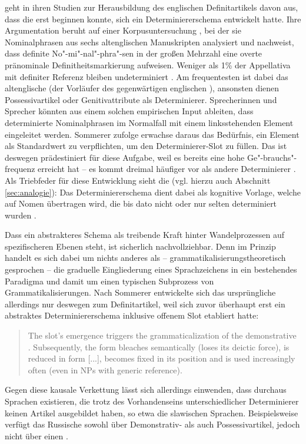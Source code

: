 \textcite{Sommerer2012,Sommerer2015} geht in ihren Studien zur Herausbildung des englischen Definitartikels davon aus, dass die  erst beginnen konnte,  sich ein Determiniererschema entwickelt hatte. Ihre Argumentation beruht auf einer  Korpusuntersuchung \parencite[vgl.][197--198]{Sommerer2012}, bei der sie Nominalphrasen aus sechs altenglischen Manuskripten analysiert und nachweist, dass definite No"-mi"-nal"-phra"-sen in der großen Mehrzahl eine overte pränominale Definitheitsmarkierung  aufweisen. Weniger als 1\% der Appellativa mit definiter Referenz bleiben undeterminiert \parencite[122]{Sommerer2015}. Am frequentesten ist dabei das altenglische   (der Vorläufer des gegenwärtigen englischen ), ansonsten dienen Possessivartikel  oder Genitivattribute als Determinierer. Sprecherinnen und Sprecher könnten aus einem solchen empirischen Input ableiten, dass determinierte Nominalphrasen im Normalfall mit einem linksstehenden Element eingeleitet werden. Sommerer zufolge erwachse daraus das Bedürfnis, ein Element als Standardwert zu verpflichten, um den Determinierer-Slot zu füllen. Das   ist deswegen prädestiniert für diese Aufgabe, weil es bereits eine hohe Ge"-brauchs"-frequenz erreicht hat -- es kommt dreimal häufiger vor als andere Determinierer \parencite[125]{Sommerer2015}. Als Triebfeder für diese Entwicklung sieht \citeauthor{Sommerer2015} die  (vgl. hierzu auch Abschnitt \ref{sec:analogie}): Das Determiniererschema dient dabei als kognitive Vorlage, welche auf Nomen übertragen wird, die bis dato nicht oder nur selten determiniert wurden \parencite[125]{Sommerer2015}. 

Dass ein abstrakteres Schema als treibende Kraft hinter Wandelprozessen auf spezifischeren Ebenen steht, ist sicherlich nachvollziehbar. 
Denn im Prinzip handelt es sich dabei um nichts anderes als -- grammatikalisierungstheoretisch gesprochen -- die graduelle Eingliederung eines Sprachzeichens in ein bestehendes Paradigma und damit um einen typischen Subprozess von Grammatikalisierungen. Nach Sommerer entwickelte sich das ursprüngliche  allerdings nur deswegen zum Definitartikel, weil sich zuvor überhaupt erst ein abstraktes Determiniererschema inklusive offenem Slot etabliert hatte: \blockcquote[205]{Sommerer2012}{The slot’s emergence triggers the grammaticalization of the demonstrative . Subsequently, the form bleaches semantically (loses its deictic force), is reduced in form [...], becomes fixed in its position and is used increasingly often (even
in NPs with generic reference).} Gegen diese kausale Verkettung lässt sich allerdings einwenden, dass durchaus Sprachen existieren, die trotz des Vorhandenseins unterschiedlicher Determinierer keinen Artikel ausgebildet haben, so etwa die slawischen Sprachen. Beispielsweise verfügt das Russische sowohl über Demonstrativ-  als auch Possessivartikel,  jedoch nicht über einen . 
 
